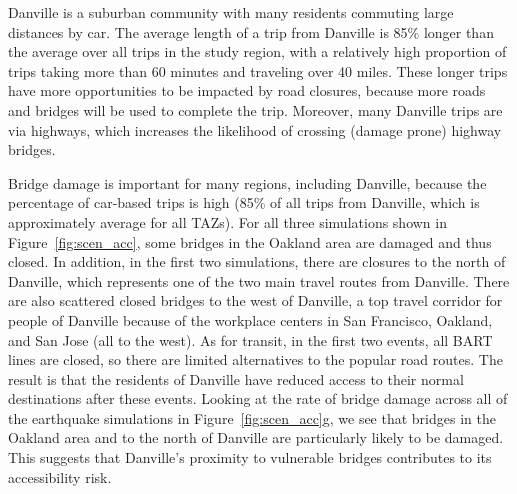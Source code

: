 
Danville is a suburban community with many residents commuting large distances by car. The average length of a trip from Danville is 85\% longer than the average over all trips in the study region, with a relatively high proportion of trips taking more than 60 minutes and traveling over 40 miles. These longer trips have more opportunities to be impacted by road closures, because more roads and bridges will be used to complete the trip. Moreover, many Danville trips are via highways, which increases the likelihood of crossing (damage prone) highway bridges. 


Bridge damage is important for many regions, including Danville, because the percentage of car-based trips is high (85\% of all trips from Danville, which is approximately average for all TAZs). For all three simulations shown in Figure~\ref{fig:scen_acc}, some bridges in the Oakland area are damaged and thus closed. In addition, in the first two simulations, there are closures to the north of Danville, which represents one of the two main travel routes from Danville. There are also scattered closed bridges to the west of Danville, a top travel corridor for people of Danville because of the workplace centers in San Francisco, Oakland, and San Jose (all to the west). As for transit, in the first two events, all BART lines are closed, so there are limited alternatives to the popular road routes. The result is that the residents of Danville have reduced access to their normal destinations after these events. 
Looking at the rate of bridge damage across all of the earthquake simulations in Figure~\ref{fig:scen_acc}{g}, we see that bridges in the Oakland area and to the north of Danville are particularly likely to be damaged. This suggests that Danville's proximity to  vulnerable bridges contributes to its accessibility risk.

